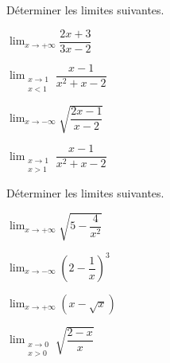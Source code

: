 \begin{exercice}
Déterminer les limites suivantes.
\begin{colenumerate}{2}
\item $\displaystyle \lim_{x\to+\infty} \dfrac{2x+3}{3x-2}$
\item $\displaystyle \lim_{\substack{x\to 1\\ x<1}} \dfrac{x-1}{x^2+x-2}$
\item $\displaystyle \lim_{x\to-\infty}\sqrt{\dfrac{2x-1}{x-2}}$
\item $\displaystyle \lim_{\substack{x\to 1\\ x>1}} \dfrac{x-1}{x^2+x-2}$
\end{colenumerate}
\end{exercice}

\begin{exercice}
Déterminer les limites suivantes.
\begin{colenumerate}{2}
\item $\displaystyle \lim_{x\to+\infty} \sqrt{5-\dfrac{4}{x^2}}$
\item $\displaystyle \lim_{x\to-\infty} \left(2-\dfrac{1}{x}\right)^3$
\item $\displaystyle \lim_{x\to+\infty} \left(x-\sqrt{x}\right)$
\item $\displaystyle \lim_{\substack{x\to 0\\ x>0}} \sqrt{\dfrac{2-x}{x}}$
\end{colenumerate}
\end{exercice}





